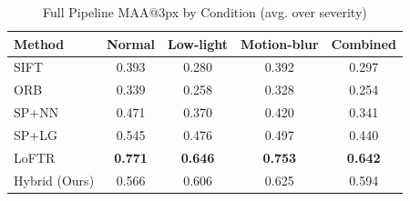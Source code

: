 \documentclass{article}
\begin{document}
\begin{table}[h]
\centering
\caption{Full Pipeline MAA@3px by Condition (avg. over severity)}
\begin{tabular}{lcccc}
\toprule
Method & Normal & Low-light & Motion-blur & Combined \\
\midrule
SIFT & 0.393 & 0.280 & 0.392 & 0.297 \\
ORB & 0.339 & 0.258 & 0.328 & 0.254 \\
SP+NN & 0.471 & 0.370 & 0.420 & 0.341 \\
SP+LG & 0.545 & 0.476 & 0.497 & 0.440 \\
LoFTR & \textbf{0.771} & \textbf{0.646} & \textbf{0.753} & \textbf{0.642} \\
\rowcolor{blue!8} Hybrid (Ours) & 0.566 & 0.606 & 0.625 & 0.594 \\
\bottomrule
\end{tabular}
\end{table}
\end{document}
